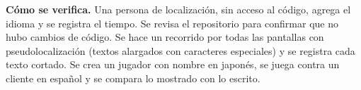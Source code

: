 \textbf{Cómo se verifica.} Una persona de localización, sin acceso al código, agrega el idioma y se registra el tiempo. Se revisa el repositorio para confirmar que no hubo cambios de código. Se hace un recorrido por todas las pantallas con pseudolocalización (textos alargados con caracteres especiales) y se registra cada texto cortado. Se crea un jugador con nombre en japonés, se juega contra un cliente en español y se compara lo mostrado con lo escrito.

